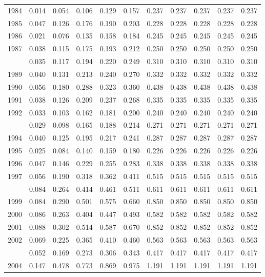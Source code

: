 \documentclass[
]{article}
\begin{document}
\begin{longtable}[t]{lrrrrrrrrrr}
1984 & 0.014 & 0.054 & 0.106 & 0.129 & 0.157 & 0.237 & 0.237 & 0.237 & 0.237 & 0.237\\
1985 & 0.047 & 0.126 & 0.176 & 0.190 & 0.203 & 0.228 & 0.228 & 0.228 & 0.228 & 0.228\\
1986 & 0.021 & 0.076 & 0.135 & 0.158 & 0.184 & 0.245 & 0.245 & 0.245 & 0.245 & 0.245\\
1987 & 0.038 & 0.115 & 0.175 & 0.193 & 0.212 & 0.250 & 0.250 & 0.250 & 0.250 & 0.250\\
\addlinespace
1988 & 0.035 & 0.117 & 0.194 & 0.220 & 0.249 & 0.310 & 0.310 & 0.310 & 0.310 & 0.310\\
1989 & 0.040 & 0.131 & 0.213 & 0.240 & 0.270 & 0.332 & 0.332 & 0.332 & 0.332 & 0.332\\
1990 & 0.056 & 0.180 & 0.288 & 0.323 & 0.360 & 0.438 & 0.438 & 0.438 & 0.438 & 0.438\\
1991 & 0.038 & 0.126 & 0.209 & 0.237 & 0.268 & 0.335 & 0.335 & 0.335 & 0.335 & 0.335\\
1992 & 0.033 & 0.103 & 0.162 & 0.181 & 0.200 & 0.240 & 0.240 & 0.240 & 0.240 & 0.240\\
\addlinespace
1993 & 0.029 & 0.098 & 0.165 & 0.188 & 0.214 & 0.271 & 0.271 & 0.271 & 0.271 & 0.271\\
1994 & 0.040 & 0.125 & 0.195 & 0.217 & 0.241 & 0.287 & 0.287 & 0.287 & 0.287 & 0.287\\
1995 & 0.025 & 0.084 & 0.140 & 0.159 & 0.180 & 0.226 & 0.226 & 0.226 & 0.226 & 0.226\\
1996 & 0.047 & 0.146 & 0.229 & 0.255 & 0.283 & 0.338 & 0.338 & 0.338 & 0.338 & 0.338\\
1997 & 0.056 & 0.190 & 0.318 & 0.362 & 0.411 & 0.515 & 0.515 & 0.515 & 0.515 & 0.515\\
\addlinespace
1998 & 0.084 & 0.264 & 0.414 & 0.461 & 0.511 & 0.611 & 0.611 & 0.611 & 0.611 & 0.611\\
1999 & 0.084 & 0.290 & 0.501 & 0.575 & 0.660 & 0.850 & 0.850 & 0.850 & 0.850 & 0.850\\
2000 & 0.086 & 0.263 & 0.404 & 0.447 & 0.493 & 0.582 & 0.582 & 0.582 & 0.582 & 0.582\\
2001 & 0.088 & 0.302 & 0.514 & 0.587 & 0.670 & 0.852 & 0.852 & 0.852 & 0.852 & 0.852\\
2002 & 0.069 & 0.225 & 0.365 & 0.410 & 0.460 & 0.563 & 0.563 & 0.563 & 0.563 & 0.563\\
\addlinespace
2003 & 0.052 & 0.169 & 0.273 & 0.306 & 0.343 & 0.417 & 0.417 & 0.417 & 0.417 & 0.417\\
2004 & 0.147 & 0.478 & 0.773 & 0.869 & 0.975 & 1.191 & 1.191 & 1.191 & 1.191 & 1.191\\

\end{longtable}
\end{document}
